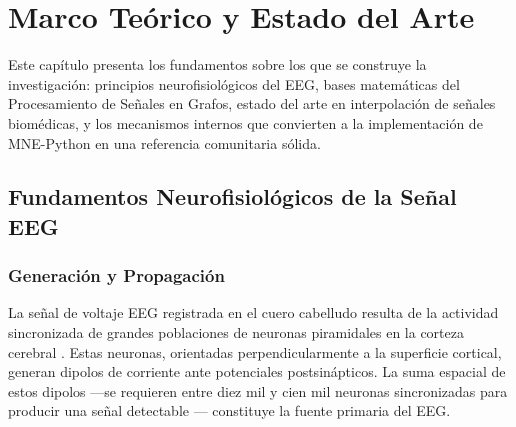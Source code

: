 \chapter{Marco Teórico y Estado del Arte}
\label{ch:marco_teorico}

Este capítulo presenta los fundamentos sobre los que se construye la investigación: principios neurofisiológicos del EEG, bases matemáticas del Procesamiento de Señales en Grafos, estado del arte en interpolación de señales biomédicas, y los mecanismos internos que convierten a la implementación de MNE-Python en una referencia comunitaria sólida.

\section{Fundamentos Neurofisiológicos de la Señal EEG}

\subsection{Generación y Propagación}

La señal de voltaje EEG registrada en el cuero cabelludo resulta de la actividad sincronizada de grandes poblaciones de neuronas piramidales en la corteza cerebral \cite{buzsaki2006rhythms}. Estas neuronas, orientadas perpendicularmente a la superficie cortical, generan dipolos de corriente ante potenciales postsinápticos. La suma espacial de estos dipolos ---se requieren entre diez mil y cien mil neuronas sincronizadas para producir una señal detectable \cite{nunez2006electric}--- constituye la fuente primaria del EEG.

